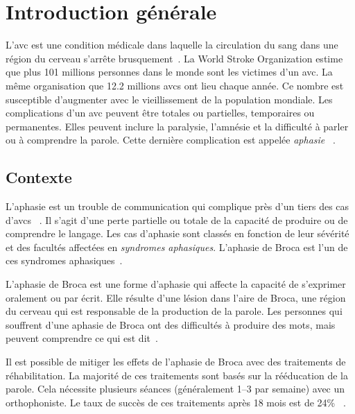 \chapter*{Introduction générale}
\label{chap.intro}

L'\gls{avc} est une condition médicale dans laquelle 
la circulation du sang dans une région du cerveau s'arrête brusquement~\cite{Larousse}.
La \foreignlanguage{english}{World Stroke Organization} estime que 
plus 101 millions personnes dans le monde sont les victimes d'un \gls{avc}.
La même organisation que 12.2 millions \glspl{avc} ont lieu chaque année.
Ce nombre est susceptible d'augmenter avec le vieillissement de la population mondiale.
Les complications d'un \gls{avc} peuvent être totales ou partielles, temporaires ou permanentes.
Elles peuvent inclure la paralysie, l'amnésie et la difficulté à parler ou à comprendre la parole.
Cette dernière complication est appelée \emph{aphasie}%
~\cite{Feigin_Brainin_Norrving_Martins_Sacco_Hacke_Fisher_Pandian_Lindsay_2022}.


\section*{Contexte}

L'aphasie est un trouble de communication qui complique près d'un tiers des cas d'\glspl{avc}%
~\cite{Flowers_Skoretz_Silver_Rochon_Fang_Flamand-Roze_Martino_2016}.
Il s'agit d'une perte partielle ou totale de la capacité de produire ou de comprendre le langage.
Les cas d'aphasie sont classés en fonction de leur sévérité et des facultés affectées en \emph{syndromes aphasiques}.
L'aphasie de Broca est l'un de ces syndromes aphasiques~\cite{Chapey_2008}.

L'aphasie de Broca est une forme d'aphasie qui affecte la capacité de s'exprimer oralement ou par écrit.
Elle résulte d'une lésion dans l'aire de Broca,
une région du cerveau qui est responsable de la production de la parole.
Les personnes qui souffrent d'une aphasie de Broca ont des difficultés à produire des mots,
mais peuvent comprendre ce qui est dit~\cite{Chapey_2008}.

Il est possible de mitiger les effets de l'aphasie de Broca avec des traitements de réhabilitation.
La majorité de ces traitements sont basés sur la rééducation de la parole.
Cela nécessite plusieurs séances (généralement 1--3 par semaine) avec un orthophoniste.
Le taux de succès de ces traitements après 18 mois est de 24\%%
~\cite{Liu_Huang_Xu_Wu_Tao_Chen_2021,Laska_Hellblom_Murray_Kahan_Von_Arbin_2001,recover}.

